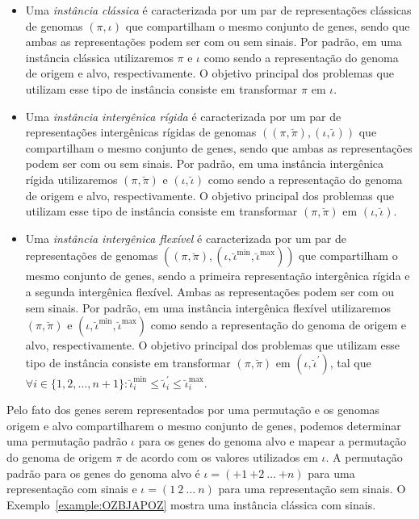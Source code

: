 \begin{itemize}
\item Uma \emph{instância clássica} é caracterizada por um par de representações clássicas de genomas $(\pi,\iota)$ que compartilham o mesmo conjunto de genes, sendo que ambas as representações podem ser com ou sem sinais. Por padrão, em uma instância clássica utilizaremos $\pi$ e $\iota$ como sendo a representação do genoma de origem e alvo, respectivamente. O objetivo principal dos problemas que utilizam esse tipo de instância consiste em transformar $\pi$ em $\iota$.
\item Uma \emph{instância intergênica rígida} é caracterizada por um par de representações intergênicas rígidas de genomas $((\pi,\breve\pi),(\iota,\breve\iota))$ que compartilham o mesmo conjunto de genes, sendo que ambas as representações podem ser com ou sem sinais. Por padrão, em uma instância intergênica rígida utilizaremos $(\pi,\breve\pi)$ e $(\iota,\breve\iota)$ como sendo a representação do genoma de origem e alvo, respectivamente. O objetivo principal dos problemas que utilizam esse tipo de instância consiste em transformar $(\pi,\breve\pi)$ em $(\iota,\breve\iota)$.
\item Uma \emph{instância intergênica flexível} é caracterizada por um par de representações de genomas $((\pi,\breve\pi),(\iota,\breve\iota^{\min},\breve\iota^{\max}))$ que compartilham o mesmo conjunto de genes, sendo a primeira representação intergênica rígida e a segunda intergênica flexível. Ambas as representações podem ser com ou sem sinais. Por padrão, em uma instância intergênica flexível utilizaremos $(\pi,\breve\pi)$ e $(\iota,\breve\iota^{\min},\breve\iota^{\max})$ como sendo a representação do genoma de origem e alvo, respectivamente. O objetivo principal dos problemas que utilizam esse tipo de instância consiste em transformar $(\pi,\breve\pi)$ em $(\iota,\breve\iota^{\prime})$, tal que $\forall i \in \{1,2,\dots,{n+1}\}: \breve\iota^{\min}_i \le \breve\iota^{\prime}_i \le \breve\iota^{\max}_i$.
\end{itemize}

Pelo fato dos genes serem representados por uma permutação e os genomas origem e alvo compartilharem o mesmo conjunto de genes, podemos determinar uma permutação padrão $\iota$ para os genes do genoma alvo e mapear a permutação do genoma de origem $\pi$ de acordo com os valores utilizados em $\iota$. A permutação padrão para os genes do genoma alvo é $\iota=({+1}~{+2}~\dots~{+n})$ para uma representação com sinais e $\iota=(1~2~\dots~n)$ para uma representação sem sinais. O Exemplo~\ref{example:OZBJAPOZ} mostra uma instância clássica com sinais.

